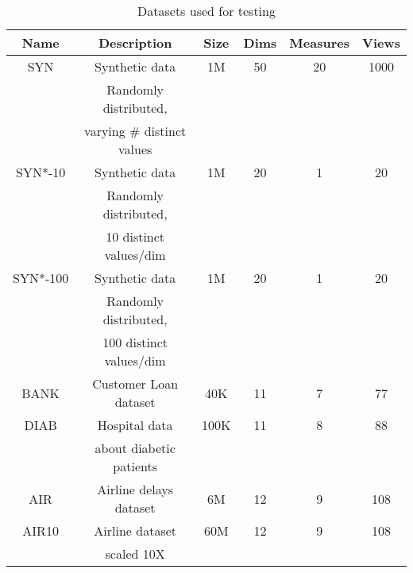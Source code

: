 \begin{table}[htb]
  \centering \scriptsize
  \begin{tabular}{|c|c|c|c|c|c|} \hline
  Name & Description & Size & Dims & Measures & Views \\ \hline
  SYN & Synthetic data & 1M & 50 & 20 & 1000 \\
  & Randomly distributed, & & & & \\ 
  & varying \# distinct values & & & & \\ \hline
  SYN*-10 & Synthetic data & 1M & 20 & 1 & 20 \\
  & Randomly distributed, & & & & \\ 
  & 10 distinct values/dim & & & & \\ \hline
  SYN*-100 & Synthetic data & 1M & 20 & 1 & 20 \\
  & Randomly distributed, & & & & \\ 
  & 100 distinct values/dim & & & & \\ \hline
  BANK  & Customer Loan dataset & 40K & 11 & 7 & 77 \\ \hline
  DIAB  & Hospital data & 100K & 11 & 8 & 88 \\
  & about diabetic patients & & & & \\ \hline
  AIR & Airline delays dataset & 6M & 12 & 9 & 108 \\ \hline
  AIR10 & Airline dataset & 60M & 12 & 9 & 108 \\ 
  & scaled 10X & & & & \\ \hline
  \end{tabular}
  \vspace{-10pt}
  \caption{Datasets used for testing}
  \label{tab:datasets} 
  \vspace{-10pt}
\end{table}














